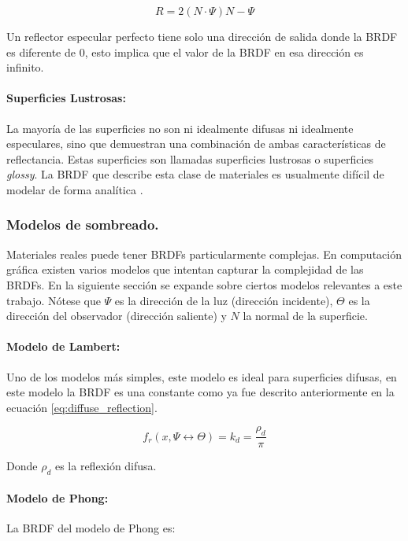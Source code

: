 \begin{equation}
    R = 2(N\cdot\Psi)N - \Psi
    \label{eq:reflectance_direction}
\end{equation}

Un reflector especular perfecto tiene solo una dirección de salida donde la \ac{BRDF} es diferente de $0$, esto implica que el valor de la \ac{BRDF} en esa dirección es infinito.

\paragraph{Superficies Lustrosas:}
La mayoría de las superficies no son ni idealmente difusas ni idealmente especulares, sino que demuestran una combinación de ambas características de reflectancia. Estas superficies son llamadas superficies lustrosas o superficies \emph{glossy}. La \ac{BRDF} que describe esta clase de materiales es usualmente difícil de modelar de forma analítica \cite{advanced_gi2006}.

\subsubsection{Modelos de sombreado.}
Materiales reales puede tener \ac{BRDF}s particularmente complejas. En computación gráfica existen varios modelos que intentan capturar la complejidad de las \ac{BRDF}s. En la siguiente sección se expande sobre ciertos modelos relevantes a este trabajo. Nótese que $\Psi$ es la dirección de la luz (dirección incidente), $\Theta$ es la dirección del observador (dirección saliente) y $N$ la normal de la superficie.

\paragraph{Modelo de Lambert:}
Uno de los modelos más simples, este modelo es ideal para superficies difusas, en este modelo la \ac{BRDF} es una constante como ya fue descrito anteriormente en la ecuación \ref{eq:diffuse_reflection}.

\begin{equation}
    f_{r}(x, \Psi\leftrightarrow\Theta) = k_{d} = \frac{\rho_{d}}{\pi}
    \label{eq:lambert}
\end{equation}

Donde $\rho_{d}$ es la reflexión difusa.

\paragraph{Modelo de Phong:}
La \ac{BRDF} del modelo de Phong es:

